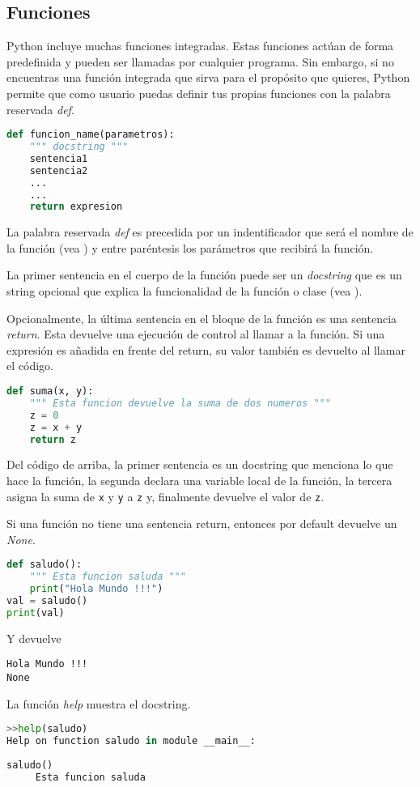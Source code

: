 	\subsection{Funciones}\label{subsec: funciones}
	Python incluye muchas funciones integradas. Estas funciones actúan de forma predefinida y pueden ser llamadas por cualquier programa. Sin embargo, si no encuentras una función integrada que sirva para el propósito que quieres, Python permite que como usuario puedas definir tus propias funciones con la palabra reservada \emph{def}.
	\begin{lstlisting}[language = {python}]
def funcion_name(parametros):
    """ docstring """
    sentencia1
    sentencia2
    ...
    ...
    return expresion
	\end{lstlisting}   
	La palabra reservada \emph{def} es precedida por un indentificador que será el nombre de la función (vea ) y entre paréntesis los parámetros que recibirá la función.\par 
	La primer sentencia en el cuerpo de la función puede ser un \emph{docstring} que es un string opcional que explica la funcionalidad de la función o clase (vea ).\par 
	Opcionalmente, la última sentencia en el bloque de la función es una sentencia \emph{return}. Esta devuelve una ejecución de control al llamar a la función. Si una expresión es añadida en frente del return, su valor también es devuelto al llamar el código.
	\begin{lstlisting}[language = {python}]
def suma(x, y):
    """ Esta funcion devuelve la suma de dos numeros """
    z = 0
    z = x + y
    return z
	\end{lstlisting}
	Del código de arriba, la primer sentencia es un docstring que menciona lo que hace la función, la segunda declara una variable local de la función, la tercera asigna la suma de \texttt{x} y \texttt{y} a \texttt{z} y, finalmente devuelve el valor de \texttt{z}.\par Si una función no tiene una sentencia return, entonces por default devuelve un \emph{None}.
	\begin{lstlisting}[language = {python}]
def saludo():
    """ Esta funcion saluda """
    print("Hola Mundo !!!")
val = saludo()
print(val)
	\end{lstlisting}
	Y devuelve
	\begin{lstlisting}[language = {[latex]tex}]
Hola Mundo !!!
None
	\end{lstlisting}
	La función \emph{help} muestra el docstring.
	\begin{lstlisting}[language = {python}]
>>help(saludo)
Help on function saludo in module __main__:
    
saludo()
     Esta funcion saluda
	\end{lstlisting}
